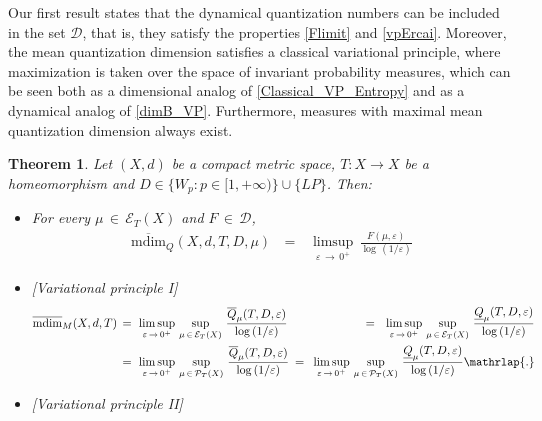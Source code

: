 \documentclass[11pt,a4paper,reqno]{amsart}
\theoremstyle{plain}
\newtheorem{maintheorem}{Theorem}
\theoremstyle{definition}
\newcommand{\ep} {\varepsilon}
\newcommand{\cD}{{\mathcal D}}
\newcommand{\cE}{{\mathcal E}}
\newcommand{\mdim}{\mathrm{mdim}}
\begin{document}
Our first result states that the dynamical quantization numbers can be included in the set $\cD$, that is, they satisfy the properties \eqref{Flimit} and \eqref{vpErcai}. Moreover, the mean quantization dimension satisfies a classical variational principle, where maximization is taken over the space of invariant probability measures, which can be seen both as a dimensional analog of \eqref{Classical_VP_Entropy} and as a dynamical analog of \eqref{dimB_VP}. Furthermore, measures with maximal mean quantization dimension always exist.


\begin{maintheorem}\label{teo:QD}
Let $(X,d)$ be a compact metric space, $T\colon X\to X$ be a homeomorphism and $D \in \{W_p\colon p \in [1,+\infty)\}\cup \{LP\}$. Then: 

\medskip

\begin{itemize}
\item[$(a)$] For every $\mu\,\in\,\cE_T(X)$  and $F\,\in\,\cD$,
\begin{eqnarray*}
\overline{\mathrm{mdim}}_Q(X,d,T,D,\mu) &\,=\,& \limsup_{\ep\,\to\,0^+}\,\frac{F(\mu,\ep)}{\log\,(1/\ep)} %
\end{eqnarray*}
\item[$(b)$] \emph{[Variational principle I]}
\begin{equation*}
    \begin{alignedat}{3}
        \overline{\mdim}_M(X,d,T) \,&=\,\, \limsup_{\varepsilon \, \to \, 0^+}\, \sup_{\mu \,\in\, \mathcal{E}_T(X)} \, \frac{\overline{Q}_\mu(T,D,\ep)}{\log\,(1/\varepsilon)} \, \,\,&=\,\,\,\, \limsup_{\varepsilon \, \to \, 0^+}\, \sup_{\mu \,\in\, \mathcal{E}_T(X)} \, \frac{\underline{Q}_\mu(T,D,\ep)}{\log\,(1/\varepsilon)}
        \\
        &=\,\, \limsup_{\varepsilon \, \to \, 0^+}\, \sup_{\mu \,\in\, \mathcal{P}_T(X)} \, \frac{\overline{Q}_\mu(T,D,\ep)}{\log\,(1/\varepsilon)} \,\, \,&=\,\,\, \limsup_{\varepsilon \, \to \, 0^+}\, \sup_{\mu \,\in\, \mathcal{P}_T(X)} \, \frac{\underline{Q}_\mu(T,D,\ep)}{\log\,(1/\varepsilon)}\mathrlap{.}
    \end{alignedat}
\end{equation*}
\smallskip

\item[$(c)$] \emph{[Variational principle II]}


\end{itemize}
\end{maintheorem}
\end{document}
